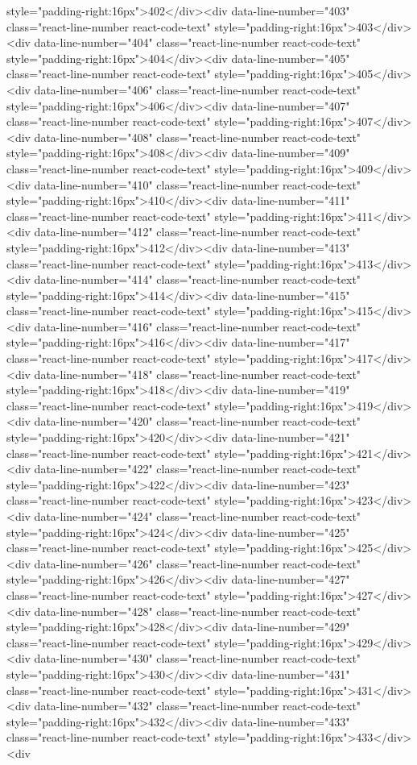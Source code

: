 style="padding-right:16px">402</div><div data-line-number="403" class="react-line-number react-code-text" style="padding-right:16px">403</div><div data-line-number="404" class="react-line-number react-code-text" style="padding-right:16px">404</div><div data-line-number="405" class="react-line-number react-code-text" style="padding-right:16px">405</div><div data-line-number="406" class="react-line-number react-code-text" style="padding-right:16px">406</div><div data-line-number="407" class="react-line-number react-code-text" style="padding-right:16px">407</div><div data-line-number="408" class="react-line-number react-code-text" style="padding-right:16px">408</div><div data-line-number="409" class="react-line-number react-code-text" style="padding-right:16px">409</div><div data-line-number="410" class="react-line-number react-code-text" style="padding-right:16px">410</div><div data-line-number="411" class="react-line-number react-code-text" style="padding-right:16px">411</div><div data-line-number="412" class="react-line-number react-code-text" style="padding-right:16px">412</div><div data-line-number="413" class="react-line-number react-code-text" style="padding-right:16px">413</div><div data-line-number="414" class="react-line-number react-code-text" style="padding-right:16px">414</div><div data-line-number="415" class="react-line-number react-code-text" style="padding-right:16px">415</div><div data-line-number="416" class="react-line-number react-code-text" style="padding-right:16px">416</div><div data-line-number="417" class="react-line-number react-code-text" style="padding-right:16px">417</div><div data-line-number="418" class="react-line-number react-code-text" style="padding-right:16px">418</div><div data-line-number="419" class="react-line-number react-code-text" style="padding-right:16px">419</div><div data-line-number="420" class="react-line-number react-code-text" style="padding-right:16px">420</div><div data-line-number="421" class="react-line-number react-code-text" style="padding-right:16px">421</div><div data-line-number="422" class="react-line-number react-code-text" style="padding-right:16px">422</div><div data-line-number="423" class="react-line-number react-code-text" style="padding-right:16px">423</div><div data-line-number="424" class="react-line-number react-code-text" style="padding-right:16px">424</div><div data-line-number="425" class="react-line-number react-code-text" style="padding-right:16px">425</div><div data-line-number="426" class="react-line-number react-code-text" style="padding-right:16px">426</div><div data-line-number="427" class="react-line-number react-code-text" style="padding-right:16px">427</div><div data-line-number="428" class="react-line-number react-code-text" style="padding-right:16px">428</div><div data-line-number="429" class="react-line-number react-code-text" style="padding-right:16px">429</div><div data-line-number="430" class="react-line-number react-code-text" style="padding-right:16px">430</div><div data-line-number="431" class="react-line-number react-code-text" style="padding-right:16px">431</div><div data-line-number="432" class="react-line-number react-code-text" style="padding-right:16px">432</div><div data-line-number="433" class="react-line-number react-code-text" style="padding-right:16px">433</div><div 